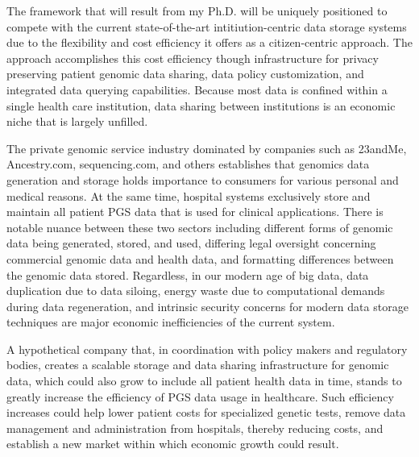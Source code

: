 \documentclass[a4paper,11pt]{article}
\begin{document}
\begin{refsection}
The framework that will result from my Ph.D. will be uniquely positioned to compete with the current state-of-the-art intitiution-centric data storage systems due to the flexibility and cost efficiency it offers as a citizen-centric approach.
The approach accomplishes this cost efficiency though infrastructure for privacy preserving patient genomic data sharing, data policy customization, and integrated data querying capabilities.
Because most data is confined within a single health care institution, data sharing between institutions is an economic niche that is largely unfilled. 

The private genomic service industry dominated by companies such as 23andMe, Ancestry.com, sequencing.com, and others establishes that genomics data generation and storage holds importance to consumers for various personal and medical reasons. 
At the same time, hospital systems exclusively store and maintain all patient PGS data that is used for clinical applications. 
There is notable nuance between these two sectors including different forms of genomic data being generated, stored, and used, differing legal oversight concerning commercial genomic data and health data, and formatting differences between the genomic data stored. 
Regardless, in our modern age of big data, data duplication due to data siloing, energy waste due to computational demands during data regeneration, and intrinsic security concerns for modern data storage techniques are major economic inefficiencies of the current system. 

A hypothetical company that, in coordination with policy makers and regulatory bodies, creates a scalable storage and data sharing infrastructure for genomic data, which could also grow to include all patient health data in time, stands to greatly increase the efficiency of PGS data usage in healthcare. 
Such efficiency increases could help lower patient costs for specialized genetic tests, remove data management and administration from hospitals, thereby reducing costs, and establish a new market within which economic growth could result. 


\end{refsection}
\end{document}
